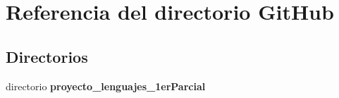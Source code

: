 \section{Referencia del directorio Git\-Hub}
\label{dir_7e17ac9cf8fba2cb04bc248c85b0ceb7}
\subsection*{Directorios}
\begin{DoxyCompactItemize}
\item 
directorio {\bf proyecto\-\_\-lenguajes\-\_\-1er\-Parcial}
\end{DoxyCompactItemize}
